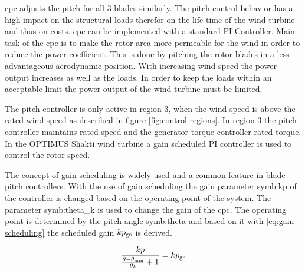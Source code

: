 \gls{cpc} adjusts the pitch for all 3 blades similarly.
The pitch control behavior has a high impact on the structural loads therefor on the life time of the wind turbine and thus on costs.
\gls{cpc} can be implemented with a standard PI-Controller.
Main task of the \gls{cpc} is to make the rotor area more permeable for the wind in order to reduce the power coefficient.
This is done by pitching the rotor blades in a less advantageous aerodynamic position.
With increasing wind speed the power output increases as well as the loads.
In order to keep the loads within an acceptable limit the power output of the wind turbine must be limited.

The pitch controller is only active in region 3, when the wind speed is above the rated wind speed as described in figure \ref{fig:control regions}.
In region 3 the pitch controller maintains rated speed and the generator torque controller rated torque. In the OPTIMUS Shakti wind turbine a gain scheduled PI controller is used to control the rotor speed.

The concept of gain scheduling is widely used and a common feature in blade pitch controllers.
With the use of gain scheduling the gain parameter \gls{symb:kp} of the controller is changed based on the operating point of the system.
The parameter \gls{symb:theta_k} is used to change the gain of the \gls{cpc}.
The operating point is determined by the pitch angle \gls{symb:theta} and based on it with \ref{eq:gain scheduling} the scheduled gain $kp_\textnormal{gs}$ is derived.

\begin{equation}
	\frac{kp}{\frac{\theta - \theta_\textnormal{min}}{\theta_k} + 1} = kp_\textnormal{gs}
	\label{eq:gain scheduling}
\end{equation}



